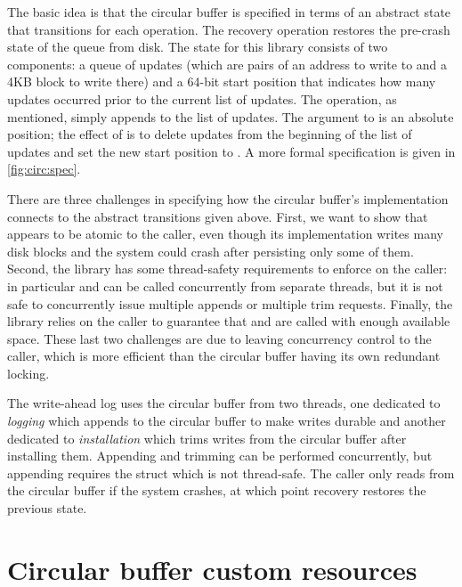 The basic idea is that the circular buffer is specified in terms of an abstract
state that transitions for each operation. The recovery operation
restores the pre-crash state of the queue from disk. The state for this library consists
of two components: a queue of updates (which are pairs of an address to write to
and a 4KB block to write there) and a 64-bit start position that indicates how
many updates occurred prior to the current list of updates. The  operation, as
mentioned, simply appends to the list of updates. The argument to 
is an absolute position; the effect of  is to delete
 updates from the beginning of the list of updates and set the
new start position to . A more formal specification is given in
\cref{fig:circ:spec}.


There are three challenges in specifying how the circular buffer's
implementation connects to the abstract transitions given above. First, we
want to show that  appears to be atomic to the caller, even though
its implementation writes many disk blocks and the system could crash after
persisting only some of them. Second, the library has some thread-safety
requirements to enforce on the caller: in particular  and
 can be called concurrently from separate threads, but it is not
safe to concurrently issue multiple appends or multiple trim requests. Finally, the library
relies on the caller to guarantee that  and  are called with enough
available space. These last two challenges are due to leaving concurrency
control to the caller, which is more efficient than the circular buffer having
its own redundant locking.

The write-ahead log uses the circular buffer from two threads, one dedicated to
\emph{logging} which appends to the circular buffer to make writes durable and another
dedicated to \emph{installation} which trims writes from the circular buffer
after installing them. Appending and trimming can be performed concurrently, but
appending requires the  struct which is not thread-safe. The
caller only reads from the circular buffer if the system crashes, at which point
recovery restores the previous state.

\section{Circular buffer custom resources}

